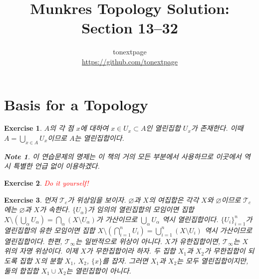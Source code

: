\documentclass{article}
\title{Munkres Topology Solution: Section 13--32}
\author{tonextpage\\
    \url{https://github.com/tonextpage}
}
\date{}
\newtheorem{exercise}{Exercise}[section]
\newtheorem*{note}{Note}
\begin{document}
\maketitle


\section{Basis for a Topology}

\begin{exercise}
    $A$의 각 점 $x$에 대하여 $x\in U_x\subset A$인 열린집합 $U_x$가 존재한다. 이때 $A=\bigcup_{x\in A}U_x$이므로 $A$는 열린집합이다.
    \begin{note}
        이 연습문제의 명제는 이 책의 거의 모든 부분에서 사용하므로 이곳에서 역시 특별한 언급 없이 이용하겠다.
    \end{note}
\end{exercise}

\begin{exercise}
    \textcolor{red}{Do it yourself!}
\end{exercise}

\begin{exercise}
    먼저 $\mathcal{T}_c$가 위상임을 보이자. $\varnothing$과 $X$의 여집합은 각각 $X$와 $\varnothing$이므로 $\mathcal{T}_c$에는 $\varnothing$과 $X$가 속한다. $\{U_\alpha\}$가 임의의 열린집합의 모임이면 집합 $X\setminus(\bigcup_{\alpha}U_\alpha)=\bigcap_\alpha(X\setminus U_\alpha)$가 가산이므로 $\bigcup_\alpha U_\alpha$ 역시 열린집합이다. $\{U_i\}_{i=1}^n$가 열린집합의 유한 모임이면 집합 $X\setminus(\bigcap_{i=1}^nU_i)=\bigcup_{i=1}^n(X\setminus U_i)$ 역시 가산이므로 열린집합이다. 한편, $\mathcal{T}_\infty$는 일반적으로 위상이 아니다. $X$가 유한집합이면, $\mathcal{T}_\infty$는 $X$ 위의 자명 위상이다. 이제 $X$가 무한집합이라 하자. 두 집합 $X_1$과 $X_2$가 무한집합이 되도록 집합 $X$의 분할 $X_1$, $X_2$, $\{x\}$를 잡자. 그러면 $X_1$과 $X_2$는 모두 열린집합이지만, 둘의 합집합 $X_1\cup X_2$는 열린집합이 아니다.
\end{exercise}
\end{document}

